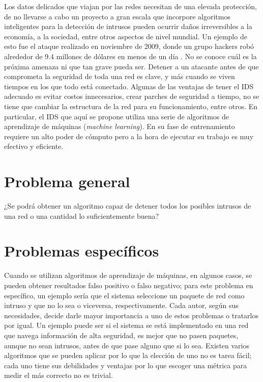 Los datos delicados que viajan por las redes necesitan de una elevada protección, de no llevarse a cabo un proyecto a gran escala que incorpore algoritmos inteligentes para la detección de intrusos pueden ocurrir daños irreversibles a la economía, a la sociedad, entre otros aspectos de nivel mundial. Un ejemplo de esto fue el ataque realizado en noviembre de 2009, donde un grupo hackers robó alrededor de 9.4 millones de dólares en menos de un día \cite{harper2011gray}. No se conoce cuál es la próxima amenaza ni que tan grave pueda ser. Detener a un atacante antes de que comprometa la seguridad de toda una red es clave, y más cuando se viven tiempos en los que todo está conectado. Algunas de las ventajas de tener el IDS adecuado es evitar costos innecesarios, crear parches de seguridad a tiempo, no se tiene que cambiar la estructura de la red para su funcionamiento, entre otros. En particular, el IDS que aquí se propone utiliza una serie de algoritmos de aprendizaje de máquinas (\textit{machine learning}). En su fase de entrenamiento requiere un alto poder de cómputo pero a la hora de ejecutar su trabajo es muy efectivo y eficiente.

\section*{Problema general}
¿Se podrá obtener un algoritmo capaz de detener todos los posibles intrusos de una red o una cantidad lo suficientemente buena?

\section*{Problemas específicos}
Cuando se utilizan algoritmos de aprendizaje de máquinas, en algunos casos, se pueden obtener resultados falso positivo o falso negativo; para este problema en específico, un ejemplo sería que el sistema seleccione un paquete de red como intruso y que no lo sea o viceversa, respectivamente. Cada autor, según sus necesidades, decide darle mayor importancia a uno de estos problemas o tratarlos por igual. Un ejemplo puede ser si el sistema se está implementado en una red que navega información de alta seguridad, es mejor que no pasen paquetes, aunque no sean intrusos, antes de que pase alguno que si lo sea. Existen varios algoritmos que se pueden aplicar por lo que la elección de uno no es tarea fácil; cada uno tiene sus debilidades y ventajas por lo que escoger una métrica para medir el más correcto no es trivial.

